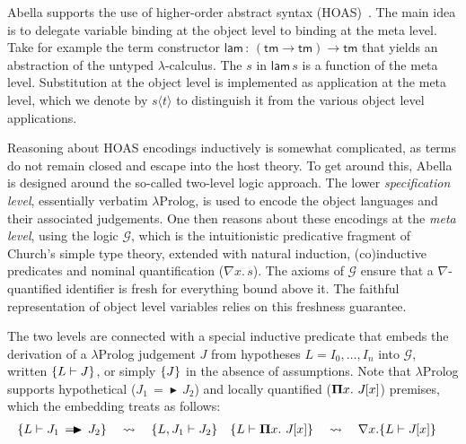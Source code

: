 \documentclass[a4paper,UKenglish]{lipics-v2016}
\newcommand{\ms}{\,}
\newcommand{\mrel}[1]{\mathrel{\ms #1 \ms}}
\newcommand{\OF}{\mrel{:}}
\newcommand{\lpPi}[1]{\mathbf{\Pi} #1.\ms\ms}
\newcommand{\lpApp}[2]{#1\langle#2\rangle}
\newcommand{\lpImp}{\mrel{=\!\blacktriangleright}}
\newcommand{\subst}[1]{\hphantom{|}\!\![{#1}]}
\theoremstyle{plain}
\begin{document}

Abella supports the use of higher-order abstract syntax (HOAS)~\cite{DBLP:conf/pldi/PfenningE88}.
The main idea is to delegate variable binding at the object level to binding at the meta level.
Take for example the term constructor $\mathsf{lam} \OF (\mathsf{tm} \to \mathsf{tm}) \to \mathsf{tm}$ that yields an abstraction of the untyped $\lambda$-calculus.
The $s$ in $\mathsf{lam}\,s$ is a function of the meta level.
Substitution at the object level is implemented as application at the meta level, which we denote by $\lpApp{s}{t}$ to distinguish it from the various object level applications.

Reasoning about HOAS encodings inductively is somewhat complicated, as terms do not remain closed and escape into the host theory.
To get around this, Abella is designed around the so-called two-level logic approach.
The lower \emph{specification level}, essentially verbatim $\lambda$Prolog, is used to encode the object languages and their associated judgements.
One then reasons about these encodings at the \emph{meta level}, using the logic $\mathcal{G}$, which is the intuitionistic predicative fragment of Church's simple type theory, extended with natural induction, (co)inductive predicates and nominal quantification ($\nabla x . \ms s$).
The axioms of $\mathcal{G}$ ensure that a $\nabla$-quantified identifier is fresh for everything bound above it.
The faithful representation of object level variables relies on this freshness guarantee.

The two levels are connected with a special inductive predicate that embeds the derivation of a $\lambda$Prolog judgement $J$ from hypotheses $L = I_0,\ldots,I_n$ into $\mathcal{G}$, written $\{L \vdash J\}$, or simply $\{J\}$ in the absence of assumptions.
Note that $\lambda$Prolog supports hypothetical ($J_1 \lpImp J_2$) and locally quantified ($\lpPi{x} J\subst{x}$) premises, which the embedding treats as follows:
\begin{align*}
  \aj{L}{J_1 \lpImp J_2} &\quad\leadsto\quad \aj{L, J_1}{J_2} & \aj{L}{\lpPi{x} J\subst{x}}&\quad\leadsto\quad \nabla x. \aj{L}{J\subst{x}}
\end{align*}
\end{document}
